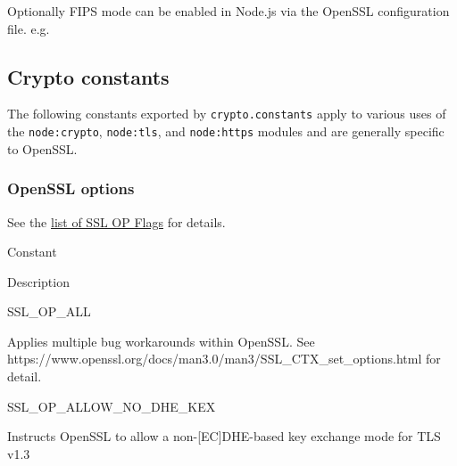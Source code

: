 Optionally FIPS mode can be enabled in Node.js via the OpenSSL
configuration file. e.g.

\begin{Shaded}
\begin{Highlighting}[]





\end{Highlighting}
\end{Shaded}

\subsection{Crypto constants}\label{crypto-constants}

The following constants exported by \texttt{crypto.constants} apply to
various uses of the \texttt{node:crypto}, \texttt{node:tls}, and
\texttt{node:https} modules and are generally specific to OpenSSL.

\subsubsection{OpenSSL options}\label{openssl-options}

See the
\href{https://wiki.openssl.org/index.php/List_of_SSL_OP_Flags\#Table_of_Options}{list
of SSL OP Flags} for details.

Constant

Description

SSL\_OP\_ALL

Applies multiple bug workarounds within OpenSSL. See
https://www.openssl.org/docs/man3.0/man3/SSL\_CTX\_set\_options.html for
detail.

SSL\_OP\_ALLOW\_NO\_DHE\_KEX

Instructs OpenSSL to allow a non-{[}EC{]}DHE-based key exchange mode for
TLS v1.3

